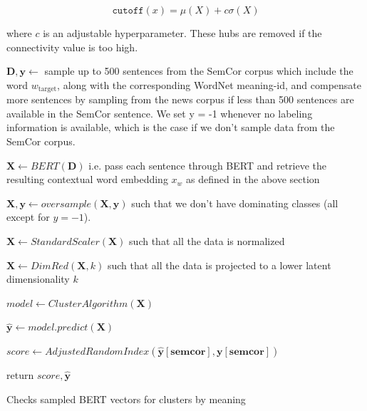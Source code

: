 \documentclass[a4paper,12pt,oneside,openright]{report}
\begin{document}
\begin{equation}
\texttt{cutoff}(x) = \mu ( X ) + c \sigma (X)
\end{equation}

where $c$ is an adjustable hyperparameter.
These hubs are removed if the connectivity value is too high. \\

\begin{algorithm}[H]
\SetAlgoLined
{}

 $\mathbf{D}, \mathbf{y} \leftarrow $  sample up to 500 sentences from the SemCor corpus which include the word $w_{\text{target}}$, along with the corresponding WordNet meaning-id, and compensate more sentences by sampling from the news corpus if less than 500 sentences are available in the SemCor sentence.
We set y = -1 whenever no labeling information is available, which is the case if we don't sample data from the SemCor corpus.\;

$ \mathbf{X} \leftarrow BERT( \mathbf{D} )$ i.e. pass each sentence through BERT and retrieve the resulting contextual word embedding $x_w$ as defined in the above section\;
 
$ \mathbf{X}, \mathbf{y} \leftarrow oversample( \mathbf{X}, \mathbf{y} )$ such that we don't have dominating classes (all except for $y = -1$).\;
 
$ \mathbf{X} \leftarrow StandardScaler( \mathbf{X})$ such that all the data is normalized\;

$ \mathbf{X} \leftarrow DimRed( \mathbf{X}, k )$ such that all the data is projected to a lower latent dimensionality $k$\;

$ model \leftarrow ClusterAlgorithm( \mathbf{X})$ \;

$ \mathbf{\hat{y}} \leftarrow model.predict(\mathbf{X}) $ \;

$ score \leftarrow AdjustedRandomIndex(\mathbf{\hat{y}[semcor]}, \mathbf{y[semcor]}) $ \;

return $ score, \mathbf{\hat{y}}$\;
    
 \caption{Checks sampled BERT vectors for clusters by  meaning}
  \label{alg:cluster_low_level}
\end{algorithm}
\end{document}
